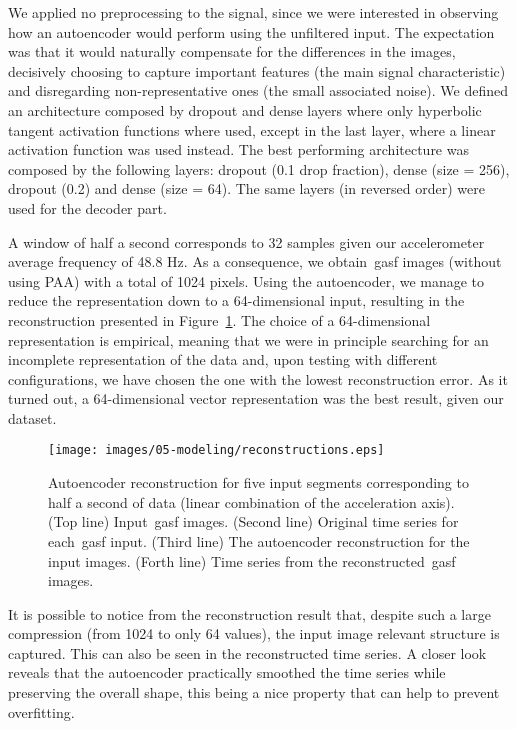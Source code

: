 We applied no preprocessing to the signal, since we were interested in observing how an autoencoder would perform using the unfiltered input. The expectation was that it would naturally compensate for the differences in the images, decisively choosing to capture important features (the main signal characteristic) and disregarding non-representative ones (the small associated noise). We defined an architecture composed by dropout and dense layers where only hyperbolic tangent activation functions where used, except in the last layer, where a linear activation function was used instead. The best performing architecture was composed by the following layers: dropout (0.1 drop fraction), dense (size = 256), dropout (0.2) and dense (size = 64). The same layers (in reversed order) were used for the decoder part.

A window of half a second corresponds to 32 samples given our accelerometer average frequency of 48.8 Hz. As a consequence, we obtain~\gls{gasf} images (without using PAA) with a total of 1024 pixels. Using the autoencoder, we manage to reduce the representation down to a 64-dimensional input, resulting in the reconstruction presented in Figure~\ref{figure:reconstruction}. The choice of a 64-dimensional representation is empirical, meaning that we were in principle searching for an incomplete representation of the data and, upon testing with different configurations, we have chosen the one with the lowest reconstruction error. As it turned out, a 64-dimensional vector representation was the best result, given our dataset. 

\begin{figure}[H]
	\centering
	\texttt{[image: images/05-modeling/reconstructions.eps]}
	\caption{Autoencoder reconstruction for five input segments corresponding to half a second of data (linear combination of the acceleration axis). ({Top line}) Input~\gls{gasf} images. ({Second line}) Original time series for each~\gls{gasf} input. ({Third line}) The autoencoder reconstruction for the input images. ({Forth line}) Time series from the reconstructed~\gls{gasf} images.}
  \label{figure:reconstruction}
\end{figure}

It is possible to notice from the reconstruction result that, despite such a large compression (from 1024 to only 64 values), the input image relevant structure is captured. This can also be seen in the reconstructed time series. A closer look reveals that the autoencoder practically smoothed the time series while preserving the overall shape, this being a nice property that can help to prevent overfitting.

